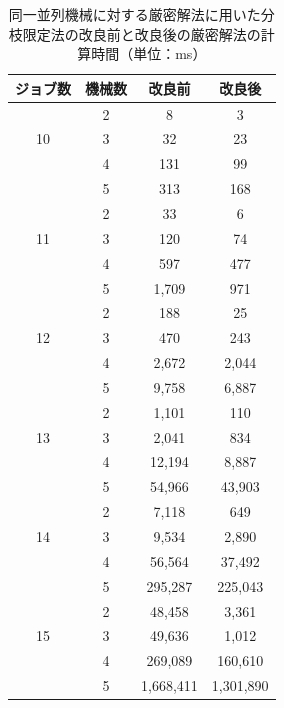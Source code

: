 \documentclass[12pt]{optlab-bachelor}
\begin{document}
\begin{table}[htb]
  \begin{center}
    \begin{tabular}{|c|c|c|c|} \hline
      ジョブ数 & 機械数 & 改良前 & 改良後 \\ \hline \hline
      & 2 & 8 & 3  \\ \cline{2-4}
      10 & 3 & 32 & 23  \\ \cline{2-4}
      & 4 & 131 & 99  \\ \cline{2-4}
      & 5 & 313 & 168  \\ \hline \hline
      & 2 & 33 & 6  \\ \cline{2-4}
      11 & 3 & 120 & 74 \\ \cline{2-4}
      & 4 & 597 & 477  \\ \cline{2-4}
      & 5 & 1,709 & 971  \\ \hline \hline
      & 2 & 188 & 25  \\ \cline{2-4}
      12 & 3 & 470 & 243  \\ \cline{2-4}
      & 4 & 2,672 & 2,044 \\ \cline{2-4}
      & 5 & 9,758 & 6,887   \\ \hline \hline
      & 2 & 1,101 & 110 \\ \cline{2-4}
      13 & 3 & 2,041 & 834 \\ \cline{2-4}
      & 4 & 12,194 & 8,887 \\ \cline{2-4}
      & 5 & 54,966 & 43,903 \\ \hline \hline
      & 2 & 7,118 & 649 \\ \cline{2-4}
      14 & 3 & 9,534 & 2,890 \\ \cline{2-4}
      & 4 & 56,564 & 37,492 \\ \cline{2-4}
      & 5 & 295,287 & 225,043  \\ \hline \hline
      & 2 & 48,458 & 3,361 \\ \cline{2-4}
      15 & 3 & 49,636 & 1,012 \\ \cline{2-4}
      & 4 & 269,089 & 160,610 \\ \cline{2-4}
      & 5 & 1,668,411 & 1,301,890  \\ \hline \hline
    \end{tabular}
    \caption{同一並列機械に対する厳密解法に用いた分枝限定法の改良前と改良後の厳密解法の計算時間（単位：ms）}
    \label{A2}
  \end{center}
\end{table}
\end{document}

